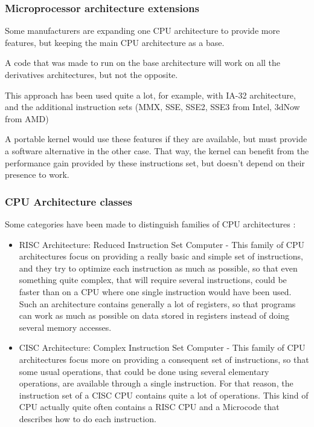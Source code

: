 \begin{frame}
  \frametitle{Microprocessor architecture extensions}

  Some manufacturers are expanding one CPU architecture to provide more features, but keeping the main CPU architecture as a base.

  \-

  A code that was made to run on the base architecture will work on all the derivatives architectures, but not the opposite.

  \-

  This approach has been used quite a lot, for example, with IA-32 architecture, and the additional instruction sets (MMX, SSE, SSE2, SSE3 from Intel, 3dNow from AMD)

  \-

  A portable kernel would use these features if they are available, but must provide a software alternative in the other case. That way, the kernel can benefit from the performance gain provided by these instructions set, but doesn't depend on their presence to work.

\end{frame}

\begin{frame}
  \frametitle{CPU Architecture classes}

  Some categories have been made to distinguish families of CPU architectures :

  \begin{itemize}
  \item RISC Architecture: Reduced Instruction Set Computer - This family of CPU architectures focus on providing a really basic and simple set of instructions, and they try to optimize each instruction as much as possible, so that even something quite complex, that will require several instructions, could be faster than on a CPU where one single instruction would have been used. Such an architecture contains generally a lot of registers, so that programs can work as much as possible on data stored in registers instead of doing several memory accesses.

  \item CISC Architecture: Complex Instruction Set Computer - This family of CPU architectures focus more on providing a consequent set of instructions, so that some usual operations, that could be done using several elementary operations, are available through a single instruction. For that reason, the instruction set of a CISC CPU contains quite a lot of operations. This kind of CPU actually quite often contains a RISC CPU and a Microcode that describes how to do each instruction.

  \end{itemize}

\end{frame}

